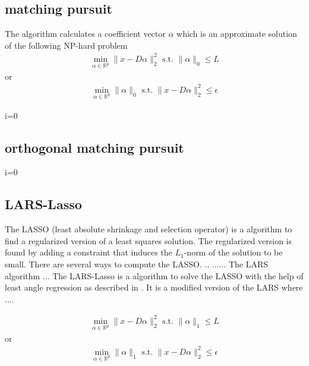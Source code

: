 \subsection{matching pursuit}
The algorithm calculates a coefficient vector $\alpha$ which is an approximate solution of the following NP-hard problem
\begin{align}
\min_{\alpha\in\mathbb{R}^{p}}  \lVert x - D\alpha \rVert^{2}_{2} \textrm{ s.t. } \lVert \alpha \rVert_{0} \leq L
\end{align}
or
\begin{align}
\min_{\alpha\in\mathbb{R}^{p}}   \lVert \alpha \rVert_{0}   \textrm{ s.t. } \lVert x - D\alpha \rVert^{2}_{2} \leq \epsilon
\end{align}
\cite{Mallat1993}
\begin{algorithm}
\begin{algorithmic}
\STATE i=0
\end{algorithmic}
\end{algorithm}

\subsection{orthogonal matching pursuit}
\cite{Pati1993}
\label{sec:omp}
\begin{algorithm}
\begin{algorithmic}
\STATE i=0
\end{algorithmic}
\end{algorithm}

\subsection{LARS-Lasso}
The LASSO (least absolute shrinkage and selection operator) is a algorithm to find a regularized version of a least squares solution.
The regularized version is found by adding a constraint that induces the $L_1$-norm of the solution to be small.
There are several ways to compute the LASSO. .. ...... \cite{} 
The LARS algorithm ... \cite{Efron2004}
The LARS-Lasso is a algorithm to solve the LASSO with the help of least angle regression
as described in \cite{Efron2004}. It is a modified version of the LARS where ....



\begin{align}
\min_{\alpha\in\mathbb{R}^{p}}  \lVert x - D\alpha \rVert^{2}_{2} \textrm{ s.t. } \lVert \alpha \rVert_{1} \leq L
\end{align}
or
\begin{align}
\min_{\alpha\in\mathbb{R}^{p}}   \lVert \alpha \rVert_{1}   \textrm{ s.t. } \lVert x - D\alpha \rVert^{2}_{2} \leq \epsilon
\end{align}

